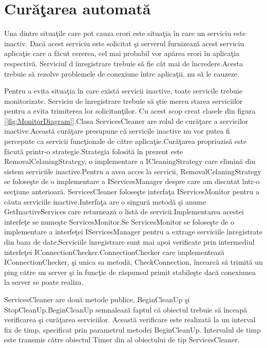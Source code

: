 \documentclass[a4paper,12pt]{report}
\let\oldref\ref
\renewcommand{\ref}[1]{[\oldref{#1}]}
\begin{document}
\section{Cur\u a\c tarea automat\u a}

Una dintre situa\c tile care pot cauza erori este situa\c tia \^in care un serviciu este inactiv.
Dac\u a acest serviciu este solicitat \c si serverul furnizeaz\u a acest serviciu aplica\c tie 
care a f\u acut cererea, cel mai probabil vor ap\u area erori \^in aplica\c tia respectiv\u a.
Serviciul d \^inregistrare trebuie s\u a fie c\^at mai de \^incredere.Acesta trebuie s\u a rezolve problemele
de conexiune \^intre aplica\c tii, nu s\u a le cauzeze.

Pentru a evita situa\c tia \^in care exist\u a servicii inactive, toate servicile trebuie monitorizate.
Serviciu de \^inregistrare trebuie s\u a \c stie mereu starea serviciilor pentru a evita trimiterea lor solicitan\c tilor.
Cu acest scop creat clasele din figura \ref{fig:MonitorDiagram}.Clasa ServicesCleaner are rolul de cur\u a\c tare a servicilor
inactive.Aceast\u a cur\u a\c tare presupune c\u a servicile inactive nu vor putea fi percepute ca servicii func\c tionale de 
c\u atre aplica\c tie.Cur\u a\c tarea propriuzis\u a este f\u acut\u a printr-o strategie.Strategia folosit\u a \^in prezent este 
RemovalCelaningStrategy, o implementare a ICleaningStrategy care elimin\u a din sistem  serviciile inactive.Pentru a avea acces la servicii, 
RemovalCelaningStrategy se folose\c ste de o implementare a IServicesManager despre care am discutat \^intr-o sec\c tiune anterioar\u a.
 ServicesCleaner folose\c ste
interfa\c ta IServicesMonitor pentru a c\u auta serviciile inactive.Interfa\c ta are o singur\u a metod\u a \c si anume GetInactiveServices 
care returneaz\u a o list\u a de servicii.Implementarea acestei interfe\c te se nume\c ste ServicesMonitor.Se ServicesMonitor se folose\c ste 
de o implementare a interfe\c tei IServicesManager pentru a extrage serviciile \^inregistrate din baza de date.Serviciile \^inregistrare 
sunt mai apoi verificate prin intermediul interfe\c tei IConnectionChecker.ConnectionChecker care implementeaz\u a IConnectionChecker,
\c si unica sa metod\u a, CheckConnection, \^incearc\u a s\u a trimit\u a un ping c\u atre un server \c si \^in func\c tie de
r\u aspunsul primit stabile\c ste dac\u a conexiunea la server se poate realiza.

ServicesCleaner are dou\u a metode publice, BeginCleanUp \c si StopCleanUp.BeginCleanUp semnaleaz\u a faptul c\u a obiectul trebuie
s\u a \^inceap\u a verificarea \c si cur\u a\c tarea serviciilor. Aceast\u a verificare este realizat\u a la un interval fix de timp,
specificat prin parametrul metodei BeginCleanUp. Intervalul de timp este transmis c\u atre obiectul Timer din al obiectului de tip 
ServicesCleaner.
\end{document}
